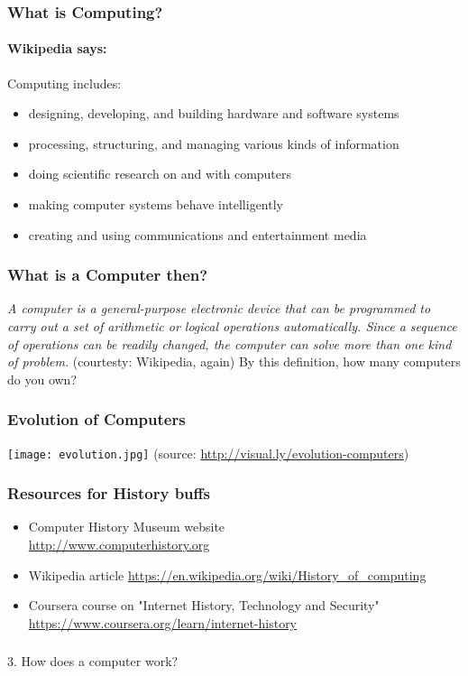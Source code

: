 \documentclass{beamer}
\begin{document}
\begin{frame}
\frametitle{What is Computing?}
\framesubtitle{Wikipedia says: }
Computing includes:
\begin{itemize}
\item designing, developing, and building hardware and software systems
\item processing, structuring, and managing various kinds of information
\item doing scientific research on and with computers
\item making computer systems behave intelligently
\item creating and using communications and entertainment media
\end{itemize}
\end{frame}

\begin{frame}
\frametitle{What is a Computer then?}
\pause
\textit{A computer is a general-purpose electronic device that can be programmed to carry out a set of arithmetic or logical operations automatically. Since a sequence of operations can be readily changed, the computer can solve more than one kind of problem.}
(courtesty: Wikipedia, again)
By this definition, how many computers do you own?
\end{frame}

\begin{frame}
\frametitle{Evolution of Computers}
\texttt{[image: evolution.jpg]}
\medskip (source: \url{http://visual.ly/evolution-computers})
\end{frame}

\begin{frame}
\frametitle{Resources for History buffs}
\begin{itemize}
\item Computer History Museum website \\ \url{http://www.computerhistory.org} 
\item Wikipedia article \url{https://en.wikipedia.org/wiki/History_of_computing}
\item Coursera course on "Internet History, Technology and Security" \\ \url{https://www.coursera.org/learn/internet-history}
\end{itemize}
\end{frame}

\begin{frame}
\frametitle{}
\begin{center}
\Large 3. How does a computer work? 
\end{center}
\end{frame}
\end{document}
